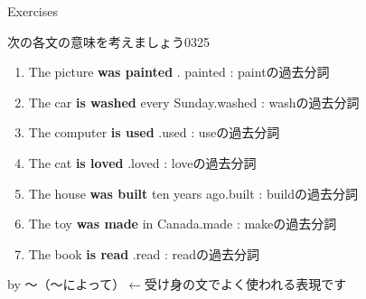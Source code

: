\documentclass[aspectratio=169,xcolor={dvipsnames,table}]{beamer}
\newcommand{\myaudio}[1]{\href{#1}{\faVolumeUp}}
\begin{document}
\begin{frame}[plain]{Exercises}
 
{\small 次の各文の意味を考えましょう}\hfill{\tiny 0325}\,{\scriptsize \myaudio{./audio/051_passive_02.mp3}}

\begin{enumerate}
 \item The picture \textbf{was painted} .\hfill{}{ \scriptsize painted : paintの過去分詞}
 \item The car \textbf{is washed} every Sunday.\hfill{}{\scriptsize washed : washの過去分詞}
 \item The computer \textbf{is used} .\hfill{}{\scriptsize used  : useの過去分詞}
 \item The cat \textbf{is loved} .\hfill{}{\scriptsize loved  : loveの過去分詞}
 \item The house \textbf{was built} ten years ago.\hfill{}{\scriptsize built  : buildの過去分詞}
 \item The toy \textbf{was made} in Canada.\hfill{}{\scriptsize made  : makeの過去分詞}
 \item The book \textbf{is read} .\hfill{}{\scriptsize read  : readの過去分詞}
\end{enumerate}

\hfill{\scriptsize by ～（～によって）$\longleftarrow$受け身の文でよく使われる表現です}


\\
\end{frame}
\end{document}
